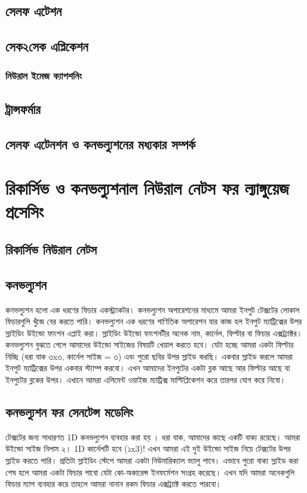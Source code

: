 \documentclass{article}[book]
\begin{document}
\subsection{সেলফ এটেশন}
\subsection{সেক২সেক এপ্লিকেশন}
\subsubsection{নিউরাল ইমেজ ক্যাপশনিং}
\subsection{ট্রান্সফর্মার}
\subsection{সেলফ এটেনশন ও কনভল্যুশনের মধ্যকার সম্পর্ক}

\section{রিকার্সিভ ও কনভল্যুশনাল নিউরাল নেটস ফর ল্যাঙ্গুয়েজ প্রসেসিং}
\subsection{রিকার্সিভ নিউরাল নেটস}
\subsection{কনভল্যুশন}
কনভল্যুশন হলো এক ধরণের ফিচার একস্ট্র্যাকটর। কনভল্যুশন অপারেশনের মাধ্যমে আমরা ইনপুট টেক্সটের লোকাল ফিচারগুলি খুঁজে বের করতে পারি। 
কনভল্যুশন এক ধরণের গাণিতিক অপারেশন যার কাজ হল ইনপুট ম্যাট্রিক্সের উপর স্লাইডিং উইন্ডো ফাংশন এপ্লাই করা।
স্লাইডিং উইন্ডো ফাংশনটীর অনেক নাম, কার্নেল, ফিল্টার বা ফিচার এক্সট্র্যাক্টর। কনভল্যুশন বুঝতে গেলে আমাদের উইন্ডো সাইজের বিষয়টি খেয়াল করতে হবে। 
যেটা হচ্ছে আমরা একটা ফিল্টার নিচ্ছি (ধরা যাক ৩x৩, কার্নেল সাইজ = ৩) এবং পুরো ছবির উপর স্লাইড করছি।
একবার স্লাইড করলে আমরা ইনপুট ম্যাট্রিক্সের উপর একবার স্ট্যাম্প করবো। এখন আমাদের ইনপুটের একটা ব্লক আছে আর ফিল্টার আছে যা ইনপুটের ব্লকের উপর। 
এখানে আমরা এলিমেন্ট ওয়াইজ ম্যাট্রিক্স মাল্টিপ্লিকেশন করে তারপর যোগ করে নিবো।



\subsection{কনভল্যুশন ফর সেনটেন্স মডেলিং}
টেক্সটের জন্য সাধারণত 1D কনভল্যুশন ব্যবহার করা হয় \cite{kalchbrenner-etal-2014-convolutional}।  ধরা যাক, আমাদের কাছে একটি বাক্য রয়েছে।  আমরা উইন্ডো সাইজ নিলাম ২। 1D কার্নেলটি হবে (১x3)!  
এখন আমরা এই দুই উইন্ডো সাইজ নিয়ে টেক্সটের উপর স্লাইড করতে পারি। প্রতিটা স্লাইডিং স্টেপে আমরা একটা নিউমারিক্যাল ভ্যালু পাবে। 
এভাবে পুরো বাক্য স্লাইড করা শেষ হলে আমরা একটা ফিচার পাবো যেটা কো-অকারেন্স ইনফর্মেশন সংগ্রহ করেছে। 
এখন যদি আমরা অনেকগুলি ফিচার ম্যাপ ব্যবহার করে তাহলে আমরা নানান রকম ফিচার এক্সট্র্যাক্ট করতে পারবো। 
\end{document}
